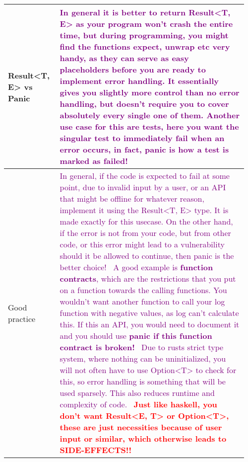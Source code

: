 \documentclass[main.tex,fontsize=8pt,paper=a4,paper=portrait,DIV=calc,]{scrartcl}
\begin{document}
\begin{table}[ht!]
\begin{tabular}{|m{0.2\linewidth}|m{0.755\linewidth}|}
\hline
Result<T, E> vs Panic & 
\textcolor{purple}{In general it is better to return Result<T, E> as your program won't crash the entire time, but during programming, you might find the functions expect, unwrap etc very handy, as they can serve as easy placeholders before you are ready to implement error handling. It essentially gives you slightly more control than no error handling, but doesn't require you to cover absolutely every single one of them.\newline
Another use case for this are tests, here you want the singular test to immediately fail when an error occurs, in fact, \textbf{panic is how a test is marked as failed!}}\\
\hline
Good practice & 
\textcolor{Purple}{In general, if the code is expected to fail at some point, due to invalid input by a user, or an API that might be offline for whatever reason, implement it using the Result<T, E> type. It is made exactly for this usecase.\newline
On the other hand, if the error is not from your code, but from other code, or this error might lead to a vulnerability should it be allowed to continue, then panic is the better choice!\newline
\, \newline
A good example is \textbf{function contracts}, which are the restrictions that you put on a function towards the calling functions. You wouldn't want another function to call your log function with negative values, as log can't calculate this. If this an API, you would need to document it and you should use \textbf{panic if this function contract is broken!}\newline
\, \newline
Due to rusts strict type system, where nothing can be uninitialized, you will not often have to use Option<T> to check for this, so error handling is something that will be used sparsely.\newline
This also reduces runtime and complexity of code.}\newline
\, \newline
\textcolor{Red}{\textbf{Just like haskell, you don't want Result<E, T> or Option<T>, these are just necessities because of user input or similar, which otherwise leads to SIDE-EFFECTS!!}}\\
\hline
\end{tabular}

\end{table}
\end{document}
